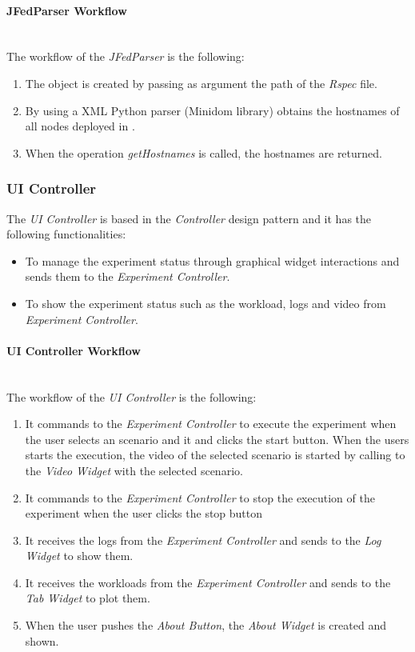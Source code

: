 \paragraph{JFedParser Workflow}~\\

The workflow of the \emph{JFedParser} is the following:
\begin{enumerate}
\item The object is created by passing as argument the path of the \emph{Rspec} file.
\item By using a \ac{XML} Python parser (Minidom library) obtains the hostnames of all nodes deployed in \vw.
\item When the operation \emph{getHostnames} is called, the hostnames are returned.
\end{enumerate}

\subsubsection{UI Controller}

The \emph{UI Controller} is based in the \emph{Controller} design pattern and it has the following functionalities:
\begin{itemize}
\item To manage the experiment status through graphical widget interactions and sends them to the \emph{Experiment Controller}.
\item To show the experiment status such as the workload, logs and video from \emph{Experiment Controller}.
\end{itemize}

\paragraph{UI Controller Workflow}~\\

The workflow of the \emph{UI Controller} is the following:
\begin{enumerate}
\item It commands to the \emph{Experiment Controller} to execute the experiment when the user selects an scenario and  it and clicks the start button. When the users starts the execution, the video of the selected scenario is started by calling to the \emph{Video Widget} with the selected scenario.
\item  It commands to the \emph{Experiment Controller} to stop the execution of the experiment when the user clicks the stop button
\item It receives the logs from the \emph{Experiment Controller} and sends to the \emph{Log Widget} to show them.
\item It receives the workloads from the \emph{Experiment Controller} and sends to the \emph{Tab Widget} to plot them.
\item When the user pushes the \emph{About Button}, the \emph{About Widget} is created and shown.
\end{enumerate}

